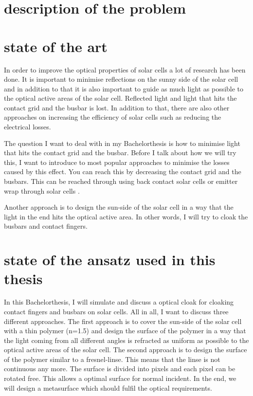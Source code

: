 \section{description of the problem}
\section{state of the art}
In order to improve the optical properties of solar cells a lot of research has been done. It is important to minimise reflections on the sunny side of the solar cell and in addition to that it is also important to guide as much light as possible to the optical active areas of the solar cell. 
Reflected light and light that hits the contact grid and the busbar is lost. In addition to that, there are also other approaches on increasing the efficiency of solar cells such as reducing the electrical losses.

The question I want to deal with in my Bachelorthesis is how to minimise light that hits the contact grid and the busbar. Before I talk about how we will try this, I want to introduce to most popular approaches to minimise the losses caused by this effect.
You can reach this by decreasing the contact grid and the busbars. This can be reached through using back contact solar cells \cite{kerschaver2006back} or emitter wrap through solar cells \cite{gee1992emitter}. 

Another approach is to design the sun-side of the solar cell in a way that the light in the end hits the optical active area. In other words, I will try to cloak the busbars and contact fingers. 

\section{state of the ansatz used in this thesis}
In this Bachelorthesis, I will simulate and discuss a optical cloak for cloaking contact fingers and busbars on solar cells. All in all, I want to discuss three different approaches. The first approach is to cover the sun-side of the solar cell with a thin polymer (n=1.5) and design the surface of the polymer in a way that the light coming from all different angles is refracted as uniform as possible to the optical active areas of the solar cell. 
The second approach is to design the surface of the polymer similar to a fresnel-linse. This means that the linse is not continuous any more. The surface is divided into pixels and each pixel can be rotated free. This allows a optimal surface for normal incident. 
In the end, we will design a metasurface which should fulfil the optical requirements. 
